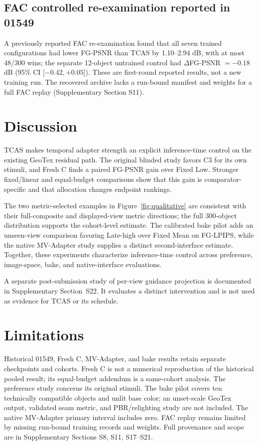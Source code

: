 \documentclass[times,twocolumn,final]{elsarticle}
\begin{document}
\subsection{FAC controlled re-examination reported in 01549}
\label{subsec:facreported}

A previously reported FAC re-examination found that all seven trained configurations had lower FG-PSNR than TCAS by 1.10--2.94 dB, with at most 48/300 wins; the separate 12-object untrained control had $\Delta$FG-PSNR $=-0.18$ dB (95\% CI [$-0.42,+0.05$]). These are first-round reported results, not a new training run. The recovered archive lacks a run-bound manifest and weights for a full FAC replay (Supplementary Section S11).

\section{Discussion}
TCAS makes temporal adapter strength an explicit inference-time control on the existing GeoTex residual path. The original blinded study favors C3 for its own stimuli, and Fresh C finds a paired FG-PSNR gain over Fixed Low. Stronger fixed/linear and equal-budget comparisons show that this gain is comparator-specific and that allocation changes endpoint rankings.

The two metric-selected examples in Figure~\ref{fig:qualitative} are consistent with their full-composite and displayed-view metric directions; the full 300-object distribution supports the cohort-level estimate. The calibrated bake pilot adds an unseen-view comparison favoring Late-high over Fixed Mean on FG-LPIPS, while the native MV-Adapter study supplies a distinct second-interface estimate. Together, these experiments characterize inference-time control across preference, image-space, bake, and native-interface evaluations.

A separate post-submission study of per-view guidance projection is documented in Supplementary Section~S22. It evaluates a distinct intervention and is not used as evidence for TCAS or its schedule.

\section{Limitations}
\label{sec:limitations}
Historical 01549, Fresh C, MV-Adapter, and bake results retain separate checkpoints and cohorts. Fresh C is not a numerical reproduction of the historical pooled result; its equal-budget addendum is a same-cohort analysis. The preference study concerns its original stimuli. The bake pilot covers ten technically compatible objects and unlit base color; an unset-scale GeoTex output, validated seam metric, and PBR/relighting study are not included. The native MV-Adapter primary interval includes zero. FAC replay remains limited by missing run-bound training records and weights. Full provenance and scope are in Supplementary Sections S8, S11, S17--S21.
\end{document}
